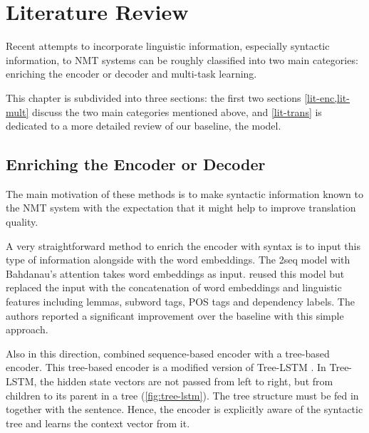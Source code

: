 \chapter{Literature Review}
\label{lit}

Recent attempts to incorporate linguistic information, especially syntactic information, to NMT systems can be roughly classified into two main categories: enriching the encoder or decoder and multi-task learning.

This chapter is subdivided into three sections: the first two sections \cref{lit-enc,lit-mult} discuss the two main categories mentioned above, and \cref{lit-trans} is dedicated to a more detailed review of our baseline, the \transformer model.

\section{Enriching the Encoder or Decoder}
\label{lit-enc}

The main motivation of these methods is to make syntactic information known to the NMT system with the expectation that it might help to improve translation quality.

A very straightforward method to enrich the encoder with syntax is to input this type of information alongside with the word embeddings.
The \seq2seq model with Bahdanau's attention takes word embeddings as input.
\cite{sennrich2016linguistic} reused this model but replaced the input with the concatenation of word embeddings and linguistic features including lemmas, subword tags, POS tags and dependency labels.
The authors reported a significant improvement over the baseline with this simple approach. 

Also in this direction, \cite{DBLP:conf/acl/EriguchiHT16} combined sequence-based encoder with a tree-based encoder.
This tree-based encoder is a modified version of Tree-LSTM \citep{DBLP:conf/acl/TaiSM15}.
In Tree-LSTM, the hidden state vectors are not passed from left to right, but from children to its parent in a tree (\cref{fig:tree-lstm}).
The tree structure must be fed in together with the sentence.
Hence, the encoder is explicitly aware of the syntactic tree and learns the context vector from it.

